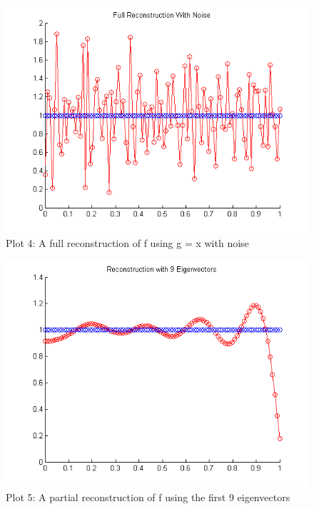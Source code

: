 \documentclass[12pt]{article}
\begin{document}
\begin{center}
\begin{figure}[H]
\includegraphics[scale=1]{plot4.png}
\caption{Plot 4: A full reconstruction of f using g = x with noise}
\end{figure}

\begin{figure}[H]
\includegraphics[scale=1]{plot5.png}
\caption{Plot 5: A partial reconstruction of f using the first 9 eigenvectors}
\end{figure}

\end{center}
\end{document}

